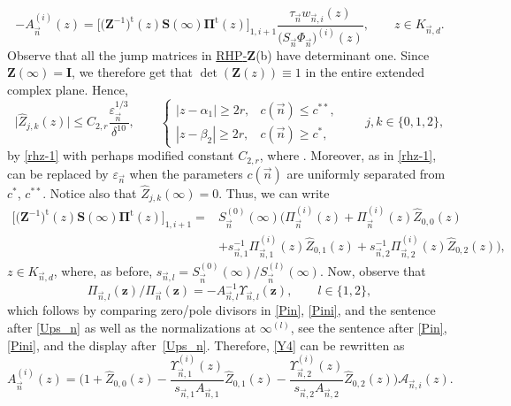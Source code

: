 \documentclass[10pt,a4paper]{amsart}
\numberwithin{equation}{section}
\renewcommand{\det}{\operatorname{det}}
\newcommand{\n}{{\vec n}}
\newcommand{\rhz} {\textnormal{RHP}-${\boldsymbol Z}$}
\newcommand{\z}	{{\boldsymbol z}}
\begin{document}
\begin{equation}
\label{Y4}
-A_\n^{(i)}(z) = \big[\bigl(\boldsymbol Z^{-1}\bigr)^{\mathrm t}(z) \boldsymbol S(\infty) \boldsymbol \Pi^\mathrm{t}(z)\big]_{1,i+1} \frac{\tau_\n w_{\n,i}(z)}{\bigl(S_\n\Phi_\n\bigr)^{(i)}(z)}, \qquad z\in K_{\n,d}.
\end{equation}
Observe that all the jump matrices in \hyperref[rhz]{\rhz}(b) have determinant one. Since $ \boldsymbol Z(\infty)=\boldsymbol I $, we therefore get that $ \det(\boldsymbol Z(z))\equiv 1 $ in the entire extended complex plane. Hence,
\begin{equation}
\label{defhatB}
\big| \widehat Z_{j,k}(z)\big| \leq C_{2,r}\frac{\varepsilon_\n^{1/3}}{\delta^{10}}, \qquad
\begin{cases}
|z-\alpha_1|\geq 2r, & c(\n)\leq c^{\ast\ast}, \\
|z-\beta_2| \geq 2r, & c(\n)\geq c^\ast,
\end{cases} \qquad j,k\in\{0,1,2\},
\end{equation}
by \eqref{rhz-1} with perhaps modified constant $ C_{2,r} $, where . Moreover, as in \eqref{rhz-1}, \smash{$ \varepsilon_\n^{1/3} $} can be replaced by $ \varepsilon_\n $ when the parameters $ c(\n) $ are uniformly separated from $ c^*$, $c^{**} $. Notice also that $ \widehat Z_{j,k}(\infty) =0 $. Thus, we can write
\begin{align*}
\big[\bigl(\boldsymbol Z^{-1}\bigr)^{\mathrm t}(z)\boldsymbol S(\infty)\boldsymbol \Pi^\mathrm{t}(z)\big]_{1,i+1} ={}&
S_\n^{(0)}(\infty)\bigl(\Pi_\n^{(i)}(z) + \Pi_\n^{(i)}(z)\widehat Z_{0,0}(z) \\
& + s_{\n,1}^{-1}\Pi_{\n,1}^{(i)}(z)\widehat Z_{0,1}(z) + s_{\n,2}^{-1}\Pi_{\n,2}^{(i)}(z)\widehat Z_{0,2}(z) \bigr),
\end{align*}
$ z\in K_{\n,d} $, where, as before, $ s_{\n,l} = S_\n^{(0)}(\infty)/S_\n^{(l)}(\infty) $. Now, observe that
\[
\Pi_{\n,l}(\z) / \Pi_\n(\z) = -A_{\n,l}^{-1}\Upsilon_{\n,l}(\z), \qquad l\in\{1,2\},
\]
which follows by comparing zero/pole divisors in \eqref{Pin}, \eqref{Pini}, and the sentence after \eqref{Ups_n} as well as the normalizations at $ \infty^{(l)} $, see the sentence after \eqref{Pin}, \eqref{Pini}, and the display after~\eqref{Ups_n}. Therefore, \eqref{Y4} can be rewritten as
\begin{equation}
\label{Y5}
A_\n^{(i)}(z) = \Bigg(1 + \widehat Z_{0,0}(z) - \frac{\Upsilon_{\n,1}^{(i)}(z)}{s_{\n,1}A_{\n,1}} \widehat Z_{0,1}(z) - \frac{\Upsilon_{\n,2}^{(i)}(z)}{s_{\n,2}A_{\n,2}} \widehat Z_{0,2}(z) \Bigg) \mathcal A_{\n,i}(z).
\end{equation}
\end{document}
